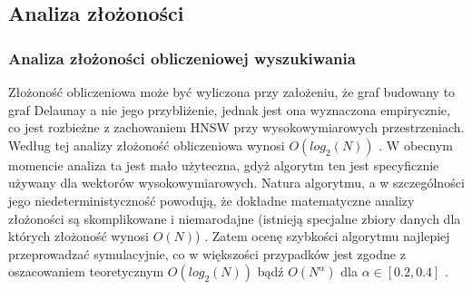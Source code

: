 \documentclass[twocolumn]{article}
\begin{document}
\subsection{Analiza złożoności}
\subsubsection{Analiza złożoności obliczeniowej wyszukiwania}
Złożoność obliczeniowa może być wyliczona przy założeniu, że graf budowany to graf Delaunay a nie jego przybliżenie, jednak jest ona wyznaczona empirycznie, co jest rozbieżne z zachowaniem HNSW przy wysokowymiarowych przestrzeniach. Według tej analizy złożoność obliczeniowa wynosi $O(log_2(N))$ \cite{Malkov2016}. W obecnym momencie analiza ta jest mało użyteczna, gdyż algorytm ten jest specyficznie używany dla wektorów wysokowymiarowych. Natura algorytmu, a w szczególności jego niedeterministyczność powodują, że dokładne matematyczne analizy złożoności są skomplikowane i niemarodajne (istnieją specjalne zbiory danych dla których złożoność wynosi $O(N)$) \cite{indyk2023worst}. Zatem ocenę szybkości algorytmu najlepiej przeprowadzać symulacyjnie, co w większości przypadków jest zgodne z oszacowaniem teoretycznym $O(log_2(N))$ bądź $O(N^\alpha)$ dla $\alpha \in [0.2, 0.4]$ \cite{Malkov2016}.
\newpage
\end{document}
